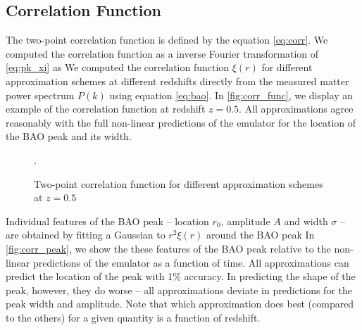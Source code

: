 \subsection{Correlation Function}
\label{sec:corr}
The two-point correlation function is defined by the equation \eqref{eq:corr}. We computed the correlation function as a inverse Fourier transformation of \eqref{eq:pk_xi} as
We computed the correlation function $\xi(r)$ for different approximation schemes at different redshifts directly from the measured matter power spectrum $P(k)$ using equation \eqref{eq:bao}. In \autoref{fig:corr_func}, we display an example of the correlation function at redshift $z=0.5$. All approximations agree reasonably with the full non-linear predictions of the emulator for the location of the BAO peak and its width.
\begin{figure}
\centering
	\begin{subfigure}{\textwidth}
	\end{subfigure}
	\begin{subfigure}{\textwidth}
		\centering
	\end{subfigure}
	\caption{Two-point correlation function for different approximation schemes at $z=0.5$}.
	\label{fig:corr_func}
\end{figure}

Individual features of the BAO peak -- location $r_0$, amplitude $A$ and width $\sigma$ -- are obtained by fitting a Gaussian to $r^2\xi(r)$ around the BAO peak
In \autoref{fig:corr_peak}, we show the these features of the BAO peak relative to the non-linear predictions of the emulator as a function of time. All approximations can predict the location of the peak with 1\% accuracy. In predicting the shape of the peak, however, they do worse -- all approximations deviate in predictions for the peak width and amplitude. Note that which approximation does best (compared to the others) for a given quantity is a function of redshift.


